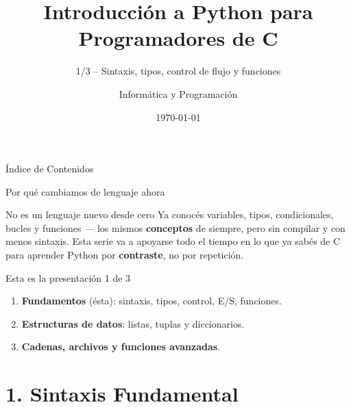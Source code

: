 \documentclass{beamer}
\title[Python desde C -- 1/3]{Introducción a Python para Programadores de C}
\subtitle{1/3 -- Sintaxis, tipos, control de flujo y funciones}
\author{Informática y Programación}
\date{\today}
\institute{UNCuyo -- Facultad de Ingeniería}
\begin{document}
\begin{frame}
  \titlepage
\end{frame}

\begin{frame}{Índice de Contenidos}
  \tableofcontents
\end{frame}

\begin{frame}{Por qué cambiamos de lenguaje ahora}
  \begin{block}{No es un lenguaje nuevo desde cero}
    Ya conocés variables, tipos, condicionales, bucles y funciones —
    los mismos \textbf{conceptos} de siempre, pero sin compilar y con menos
    sintaxis. Esta serie va a apoyarse todo el tiempo en lo que ya sabés de
    C para aprender Python por \textbf{contraste}, no por repetición.
  \end{block}
  \begin{alertblock}{Esta es la presentación 1 de 3}
    \begin{enumerate}
      \item \textbf{Fundamentos} (ésta): sintaxis, tipos, control, E/S, funciones.
      \item \textbf{Estructuras de datos}: listas, tuplas y diccionarios.
      \item \textbf{Cadenas, archivos y funciones avanzadas}.
    \end{enumerate}
  \end{alertblock}
\end{frame}


\section{1. Sintaxis Fundamental}
\end{document}

